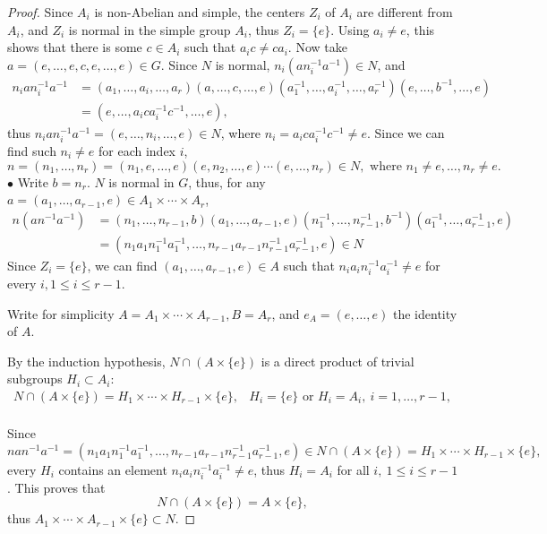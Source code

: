 \documentclass[11pt,a4paper]{article}
\begin{document}
\begin{proof}
 Since  $A_i$ is non-Abelian and simple, the centers $Z_i$ of $A_i$ are different from $A_i$, and $Z_i$ is normal in the simple group $A_i$, thus $Z_i = \{e\}$. Using $a_i \ne e$, this shows that there is some $c \in A_i$ such that $a_i c \ne c a_i$. Now take $a = (e,\ldots,e,c,e,\ldots,e) \in G$. Since $N$ is normal, $n_i(an_i^{-1}a^{-1}) \in N$, and
 \begin{align*}
 n_ian_i^{-1}a^{-1} &= (a_1,\ldots,a_i, \ldots, a_r) (a,\ldots,c,\ldots,e)(a_1^{-1},\ldots,a_i^{-1},\ldots,a_r^{-1})(e,\ldots,b^{-1},\ldots,e)\\
 &=(e,\ldots,a_ica_i^{-1}c^{-1},\ldots,e),
 \end{align*}
thus $ n_ian_i^{-1}a^{-1} =(e,\ldots,n_i,\ldots,e)\in N$, where $n_i = a_ica_i^{-1}c^{-1} \ne e$. Since we can find such $n_i\ne e$ for each index $i$,
$$n= (n_1,\ldots,n_r) = (n_1,e,\ldots,e)(e,n_2,\ldots,e)\cdots (e,\ldots,n_r) \in N, \text{ where } n_1 \ne e,\ldots,n_r \ne e.$$
$\bullet$ Write $b = n_r$. $N$ is normal in $G$, thus, for any $a= (a_1,\ldots,a_{r-1},e) \in A_1\times\cdots\times A_r$,
\begin{align*}
n (an^{-1}a^{-1}) &= (n_1,\ldots,n_{r-1},b)(a_1,\ldots,a_{r-1},e) (n_1^{-1},\ldots,n_{r-1}^{-1},b^{-1})(a_1^{-1},\ldots,a_{r-1}^{-1},e)\\
&=(n_1a_1n_1^{-1}a_1^{-1},\ldots,n_{r-1}a_{r-1}n_{r-1}^{-1}a_{r-1}^{-1}, e) \in N
\end{align*}
Since $Z_i = \{e\}$, we can find $(a_1,\ldots,a_{r-1},e) \in A$ such that $n_ia_in_i^{-1}a_i^{-1} \ne e$ for every $i, 1\leq i \leq r-1$.

Write for simplicity $A = A_1\times \cdots \times A_{r-1},B = A_r$, and $e_A = (e,\ldots,e)$ the identity of $A$.

By the induction hypothesis, $N\cap (A\times \{e\})$ is a direct product of trivial subgroups $H_i \subset A_i$:
$$\begin{array}{ll}
N\cap (A\times \{e\}) = H_1\times \cdots \times H_{r-1}\times\{e\},  &H_i =\{e\} \text{ or } H_i=A_i,\  i=1,\ldots,r-1,\\
\end{array} 
$$

Since $$nan^{-1}a^{-1} = (n_1a_1n_1^{-1}a_1^{-1},\ldots,n_{r-1}a_{r-1}n_{r-1}^{-1}a_{r-1}^{-1}, e) \in N \cap (A\times\{e\}) = H_1\times\cdots \times H_{r-1} \times \{e\},$$
every $H_i$ contains an element $n_ia_in_i^{-1}a_i^{-1} \ne e$, thus $H_i = A_i$ for all $i,\ 1\leq i \leq r-1$.   This proves that
$$N\cap (A\times \{e\})  = A\times \{e\},$$
thus $A_1 \times \cdots \times A_{r-1} \times \{e\} \subset N$.


\end{proof}
\end{document}
